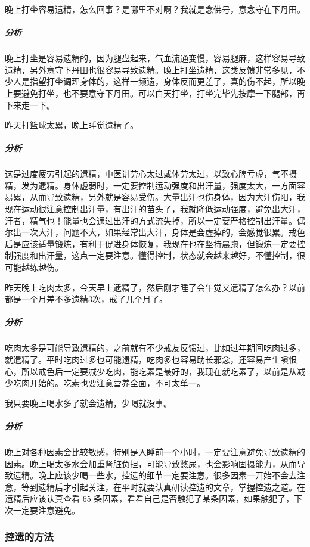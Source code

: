 \begin{case}
    晚上打坐容易遗精，怎么回事？是哪里不对啊？我就是念佛号，意念守在下丹田。
    \subparagraph{分析} 晚上打坐是容易遗精的，因为腿盘起来，气血流通变慢，容易腿麻，这样容易导致遗精，另外意守下丹田也很容易导致遗精。晚上打坐遗精，这类反馈非常多见，不少人是指望打坐调理身体的，这样一频遗，身体反而更差了，真的伤不起，所以晚上要避免打坐，也不要意守下丹田。可以白天打坐，打坐完毕先按摩一下腿部，再下来走一下。
\end{case}

\begin{case}
    昨天打篮球太累，晚上睡觉遗精了。
    \subparagraph{分析} 这是过度疲劳引起的遗精，中医讲劳心太过或体劳太过，以致心脾亏虚，气不摄精，发为遗精。身体虚弱时，一定要控制运动强度和出汗量，强度太大，一方面容易累，从而导致遗精，另外就是容易受伤。大量出汗也伤身体，因为大汗伤阳，我现在运动很注意控制出汗量，有出汗的苗头了，我就降低运动强度，避免出大汗，汗者，精气也！能量也会通过出汗的方式流失掉，所以一定要严格控制出汗量。偶尔出一次大汗，问题不大，如果经常出大汗，身体是会虚掉的，会感觉很累。戒色后是应该适量锻炼，有利于促进身体恢复，我现在也在坚持晨跑，但锻炼一定要控制强度和出汗量，这点一定要注意。懂得控制，状态就会越来越好，不懂控制，很可能越练越伤。
\end{case}

\begin{case}
    昨天晚上吃肉太多，今天早上遗精了，然后刚才睡了会午觉又遗精了怎么办？以前都是一个月差不多遗精3次，戒了几个月了。
    \subparagraph{分析} 吃肉太多是可能导致遗精的，之前就有不少戒友反馈过，比如过年期间吃肉过多，就遗精了。平时吃肉过多也可能遗精，吃肉多也容易助长邪念，还容易产生嗔恨心，所以戒色后一定要减少吃肉，能吃素是最好的，我现在就吃素了，以前是从减少吃肉开始的。吃素也要注意营养全面，不可太单一。
\end{case}

\begin{case}
    我只要晚上喝水多了就会遗精，少喝就没事。
    \subparagraph{分析} 晚上对各种因素会比较敏感，特别是入睡前一个小时，一定要注意避免导致遗精的因素。晚上喝太多水会加重肾脏负担，可能导致憋尿，也会影响固摄能力，从而导致遗精。晚上应该少喝一些水，控遗的细节一定要注意。很多因素一开始不会去注意，等到遗精后才引起关注，在平时就要认真研读控遗的文章，掌握控遗之道。在遗精后应该认真查看 65 条因素，看看自己是否触犯了某条因素，如果触犯了，下次一定要注意避免。
\end{case}

\subsubsection{控遗的方法}

